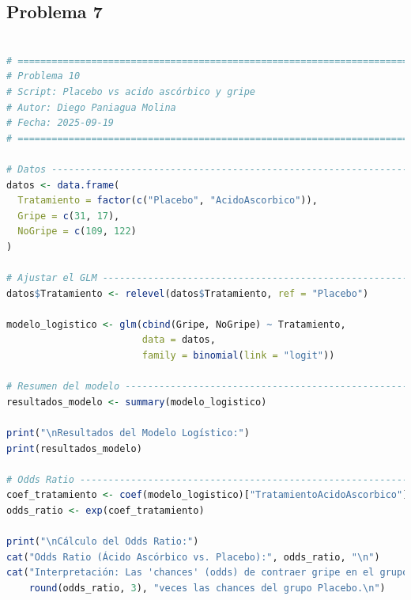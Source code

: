 \clearpage

\subsection{Problema \textcolor{CIMATRed}{7}}

\begin{lstlisting}[language=R, caption={Script: Placebo vs acido ascórbico y gripe.}, label={lst:script8}]

# =============================================================================
# Problema 10
# Script: Placebo vs acido ascórbico y gripe
# Autor: Diego Paniagua Molina
# Fecha: 2025-09-19
# =============================================================================

# Datos -----------------------------------------------------------------------
datos <- data.frame(
  Tratamiento = factor(c("Placebo", "AcidoAscorbico")),
  Gripe = c(31, 17),
  NoGripe = c(109, 122)
)

# Ajustar el GLM --------------------------------------------------------------
datos$Tratamiento <- relevel(datos$Tratamiento, ref = "Placebo")

modelo_logistico <- glm(cbind(Gripe, NoGripe) ~ Tratamiento,
                        data = datos,
                        family = binomial(link = "logit"))

# Resumen del modelo ----------------------------------------------------------
resultados_modelo <- summary(modelo_logistico)

print("\nResultados del Modelo Logístico:")
print(resultados_modelo)

# Odds Ratio ------------------------------------------------------------------
coef_tratamiento <- coef(modelo_logistico)["TratamientoAcidoAscorbico"]
odds_ratio <- exp(coef_tratamiento)

print("\nCálculo del Odds Ratio:")
cat("Odds Ratio (Ácido Ascórbico vs. Placebo):", odds_ratio, "\n")
cat("Interpretación: Las 'chances' (odds) de contraer gripe en el grupo que tomó Ácido Ascórbico son",
    round(odds_ratio, 3), "veces las chances del grupo Placebo.\n")

\end{lstlisting}

\clearpage